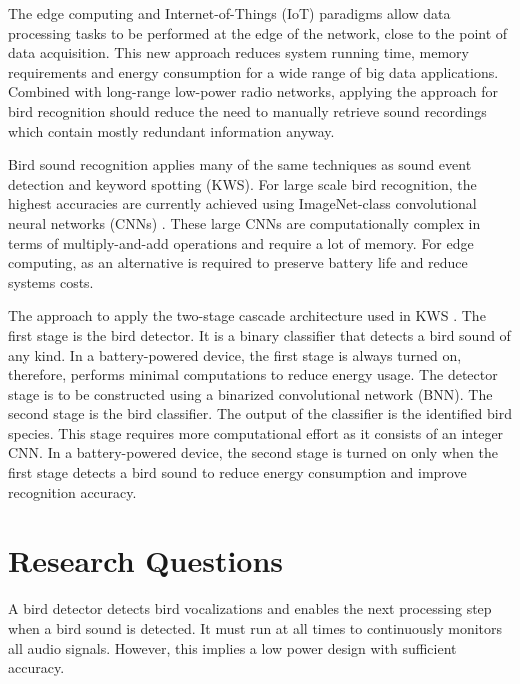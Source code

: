 The edge computing and Internet-of-Things (IoT) paradigms allow data processing tasks to be performed at the edge of the network, close to the point of data acquisition.
This new approach reduces system running time, memory requirements and energy consumption for a wide range of big data applications.
Combined with long-range low-power radio networks, applying the approach for bird recognition should reduce the need to manually retrieve sound recordings which contain mostly redundant information anyway.



Bird sound recognition applies many of the same techniques as sound event detection and keyword spotting (KWS).
For large scale bird recognition, the highest accuracies are currently achieved using ImageNet-class convolutional neural networks (CNNs) \citep{Kahl2019}.
These large CNNs are computationally complex in terms of multiply-and-add operations and require a lot of memory.
For edge computing, as an alternative is required to preserve battery life and reduce systems costs.


The approach to apply the two-stage cascade architecture used in KWS \cite{Sigtia2018,Price2018,Liu2019}.
The first stage is the bird detector.
It is a binary classifier that detects a bird sound of any kind. 
In a battery-powered device, the first stage is always turned on, therefore, performs minimal computations to reduce energy usage.
The detector stage is to be constructed using a binarized convolutional network (BNN). The second stage is the bird classifier.
The output of the classifier is the identified bird species.
This stage requires more computational effort as it consists of an integer CNN.
In a battery-powered device, the second stage is turned on only when the first stage detects a bird sound to reduce energy consumption and improve recognition accuracy.



\section{Research Questions}

A bird detector detects bird vocalizations and enables the next processing step when a bird sound is detected.
It must run at all times to continuously monitors all audio signals. However, this implies a low power design with sufficient accuracy.

